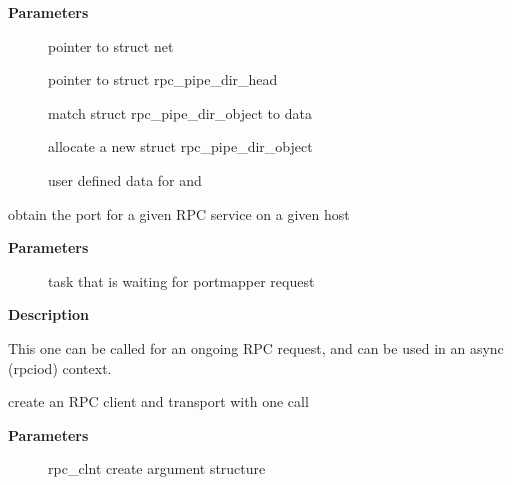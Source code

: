 \documentclass[a4paper,8pt,english]{sphinxmanual}
\begin{document}
\textbf{Parameters}
\begin{description}
\item[{}] \leavevmode
pointer to struct net

\item[{}] \leavevmode
pointer to struct rpc\_pipe\_dir\_head

\item[{}] \leavevmode
match struct rpc\_pipe\_dir\_object to data

\item[{}] \leavevmode
allocate a new struct rpc\_pipe\_dir\_object

\item[{}] \leavevmode
user defined data for  and 

\end{description}

\begin{fulllineitems}
\label{networking/kapi:c.rpcb_getport_async}
obtain the port for a given RPC service on a given host

\end{fulllineitems}


\textbf{Parameters}
\begin{description}
\item[{}] \leavevmode
task that is waiting for portmapper request

\end{description}

\textbf{Description}

This one can be called for an ongoing RPC request, and can be used in
an async (rpciod) context.

\begin{fulllineitems}
\label{networking/kapi:c.rpc_create}
create an RPC client and transport with one call

\end{fulllineitems}


\textbf{Parameters}
\begin{description}
\item[{}] \leavevmode
rpc\_clnt create argument structure

\end{description}
\end{document}
